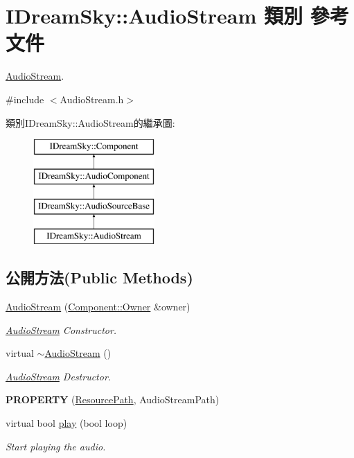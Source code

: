 \hypertarget{class_i_dream_sky_1_1_audio_stream}{}\section{I\+Dream\+Sky\+:\+:Audio\+Stream 類別 參考文件}
\label{class_i_dream_sky_1_1_audio_stream}


\hyperlink{class_i_dream_sky_1_1_audio_stream}{Audio\+Stream}.  




{\ttfamily \#include $<$Audio\+Stream.\+h$>$}

類別\+I\+Dream\+Sky\+:\+:Audio\+Stream的繼承圖\+:\begin{figure}[H]
\begin{center}
\leavevmode
\includegraphics[height=4.000000cm]{class_i_dream_sky_1_1_audio_stream}
\end{center}
\end{figure}
\subsection*{公開方法(Public Methods)}
\begin{DoxyCompactItemize}
\item 
\hyperlink{class_i_dream_sky_1_1_audio_stream_a864a5222a35e09b87c4dbe5047fefc50}{Audio\+Stream} (\hyperlink{class_i_dream_sky_1_1_component_1_1_owner}{Component\+::\+Owner} \&owner)
\begin{DoxyCompactList}\small\item\em \hyperlink{class_i_dream_sky_1_1_audio_stream}{Audio\+Stream} Constructor. \end{DoxyCompactList}\item 
virtual \hyperlink{class_i_dream_sky_1_1_audio_stream_a480e5d3468bfe9357dd6c40649b1e449}{$\sim$\+Audio\+Stream} ()
\begin{DoxyCompactList}\small\item\em \hyperlink{class_i_dream_sky_1_1_audio_stream}{Audio\+Stream} Destructor. \end{DoxyCompactList}\item 
{\bfseries P\+R\+O\+P\+E\+R\+TY} (\hyperlink{class_i_dream_sky_1_1_resource_path}{Resource\+Path}, Audio\+Stream\+Path)\hypertarget{class_i_dream_sky_1_1_audio_stream_a0a9d9f73ff1b60a6333bdf7c14c1346a}{}\label{class_i_dream_sky_1_1_audio_stream_a0a9d9f73ff1b60a6333bdf7c14c1346a}

\item 
virtual bool \hyperlink{class_i_dream_sky_1_1_audio_stream_afe27165ca951ac7e01914065ffecf741}{play} (bool loop)
\begin{DoxyCompactList}\small\item\em Start playing the audio. \end{DoxyCompactList}\end{DoxyCompactItemize}
